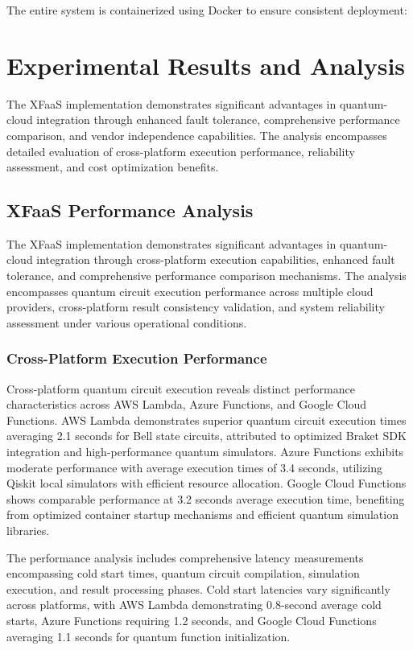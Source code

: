 \documentclass[onecolumn]{IEEEtran}
\begin{document}
The entire system is containerized using Docker to ensure consistent deployment:



\section{Experimental Results and Analysis}

The XFaaS implementation demonstrates significant advantages in quantum-cloud integration through enhanced fault tolerance, comprehensive performance comparison, and vendor independence capabilities. The analysis encompasses detailed evaluation of cross-platform execution performance, reliability assessment, and cost optimization benefits.

\subsection{XFaaS Performance Analysis}

The XFaaS implementation demonstrates significant advantages in quantum-cloud integration through cross-platform execution capabilities, enhanced fault tolerance, and comprehensive performance comparison mechanisms. The analysis encompasses quantum circuit execution performance across multiple cloud providers, cross-platform result consistency validation, and system reliability assessment under various operational conditions.

\subsubsection{Cross-Platform Execution Performance}

Cross-platform quantum circuit execution reveals distinct performance characteristics across AWS Lambda, Azure Functions, and Google Cloud Functions. AWS Lambda demonstrates superior quantum circuit execution times averaging 2.1 seconds for Bell state circuits, attributed to optimized Braket SDK integration and high-performance quantum simulators. Azure Functions exhibits moderate performance with average execution times of 3.4 seconds, utilizing Qiskit local simulators with efficient resource allocation. Google Cloud Functions shows comparable performance at 3.2 seconds average execution time, benefiting from optimized container startup mechanisms and efficient quantum simulation libraries.

The performance analysis includes comprehensive latency measurements encompassing cold start times, quantum circuit compilation, simulation execution, and result processing phases. Cold start latencies vary significantly across platforms, with AWS Lambda demonstrating 0.8-second average cold starts, Azure Functions requiring 1.2 seconds, and Google Cloud Functions averaging 1.1 seconds for quantum function initialization.
\end{document}
